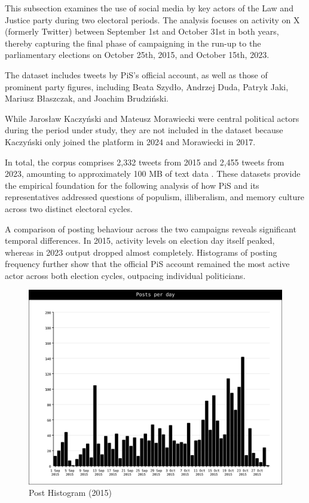 This subsection examines the use of social media by key actors of the Law and Justice party during two electoral periods. The analysis focuses on activity on X (formerly Twitter) between September 1st and October 31st in both years, thereby capturing the final phase of campaigning in the run-up to the parliamentary elections on October 25th, 2015, and October 15th, 2023.

The dataset includes tweets by PiS's official account, as well as those of prominent party figures, including Beata Szydło, Andrzej Duda, Patryk Jaki, Mariusz Błaszczak, and Joachim Brudziński. 

\pagebreak

While Jarosław Kaczyński and Mateusz Morawiecki were central political actors during the period under study, they are not included in the dataset because Kaczyński only joined the platform in 2024 and Morawiecki in 2017.

In total, the corpus comprises 2,332 tweets from 2015 and 2,455 tweets from 2023, amounting to approximately 100 MB of text data \citep{rybicki_2025_16933320}. These datasets provide the empirical foundation for the following analysis of how PiS and its representatives addressed questions of populism, illiberalism, and memory culture across two distinct electoral cycles.

A comparison of posting behaviour across the two campaigns reveals significant temporal differences. In 2015, activity levels on election day itself peaked, whereas in 2023 output dropped almost completely. Histograms of posting frequency further show that the official PiS account remained the most active actor across both election cycles, outpacing individual politicians.

\begin{figure}[h!]
\centering
\includegraphics[width=\linewidth]{Graphics/histogram-2015.png}
\caption{Post Histogram (2015)}
\end{figure}

